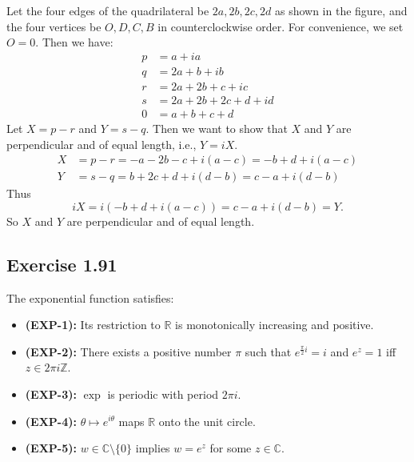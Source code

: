 \documentclass{article}
\begin{document}
\begin{solution}
  Let the four edges of the quadrilateral be $2a, 2b, 2c, 2d$ as
  shown in the figure, and the four vertices be $O, D, C, B$ in
  counterclockwise order. For convenience, we set $O = 0$.
  Then we have:
  \[
    \begin{aligned}
      p &= a + ia \\
      q &= 2a + b + ib \\
      r &= 2a + 2b + c + ic \\
      s &= 2a + 2b + 2c + d + id \\
      0 &= a+b+c+d
    \end{aligned}
  \]
  Let $X = p - r$ and $Y = s - q$. Then we want to show that $X$ and
  $Y$ are perpendicular and of equal length, i.e., $Y = iX$.
  \[
    \begin{aligned}
      X &= p-r = -a - 2b - c + i(a - c) = -b+d+i(a-c) \\
      Y &= s-q = b + 2c + d + i (d - b) = c-a+i(d-b)
    \end{aligned}
  \]
  Thus \[
    iX = i(-b+d+i(a-c)) = c-a + i(d-b) = Y.
  \]
  So $X$ and $Y$ are perpendicular and of equal length.

\end{solution}

\subsection{Exercise 1.91}

\begin{lemma}
  The exponential function satisfies:
  \begin{itemize}
    \item \textbf{(EXP-1):} Its restriction to $\mathbb{R}$ is
      monotonically increasing and positive.
    \item \textbf{(EXP-2):} There exists a positive number $\pi$ such
      that $e^{\frac{\pi}{2} i} = i$ and $e^z = 1$ iff $z \in 2\pi i
      \mathbb{Z}$.
    \item \textbf{(EXP-3):} $\exp$ is periodic with period $2\pi i$.
    \item \textbf{(EXP-4):} $\theta \mapsto e^{i\theta}$ maps
      $\mathbb{R}$ onto the unit circle.
    \item \textbf{(EXP-5):} $w \in \mathbb{C} \setminus \{0\}$
      implies $w = e^z$ for some $z \in \mathbb{C}$.
  \end{itemize}
\end{lemma}
\end{document}
